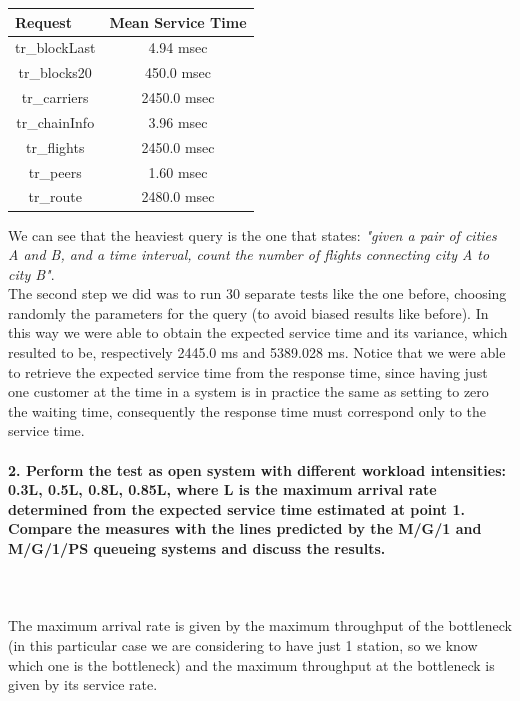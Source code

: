 \documentclass[11pt]{scrartcl} %
\begin{document}
\begin{table}[H]
\centering
\begin{tabular}{c|c}
\multicolumn{1}{l|}{Request} & \multicolumn{1}{l}{Mean Service Time} \\ \hline
tr\_blockLast & 4.94 msec \\
tr\_blocks20 & 450.0 msec \\
tr\_carriers & 2450.0 msec \\
tr\_chainInfo & 3.96 msec \\
tr\_flights & 2450.0 msec \\
tr\_peers & 1.60 msec \\
tr\_route & 2480.0 msec \\
\end{tabular}
\end{table}

We can see that the heaviest query is the one that states: \textit{"given a pair of cities A and B, and a time interval, count the number of flights connecting city A to city B"}.\\

The second step we did was to run 30 separate tests like the one before, choosing randomly the parameters for the query (to avoid biased results like before). In this way we were able to obtain the expected service time and its variance, which resulted to be, respectively 2445.0 ms and 5389.028 ms.
Notice that we were able to retrieve the expected service time from the response time, since having just one customer at the time in a system is in practice the same as setting to zero the waiting time, consequently the response time must correspond only to the service time.

\paragraph*{2. Perform the test as open system with different workload intensities: 0.3L, 0.5L, 0.8L, 0.85L, where L is the maximum arrival rate determined from the expected service time estimated at point 1. Compare the measures with the lines predicted by the M/G/1 and M/G/1/PS queueing systems and discuss the results.} \mbox{}\\\\

The maximum arrival rate is given by the maximum throughput of the bottleneck (in this particular case we are considering to have just 1 station, so we know which one is the bottleneck) and the maximum throughput at the bottleneck is given by its service rate.
\end{document}
